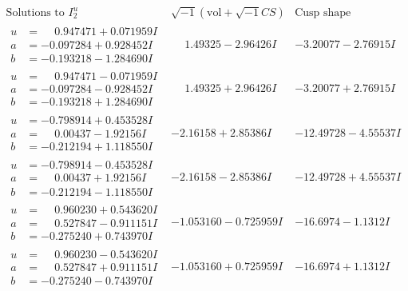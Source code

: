 \documentclass[1p]{elsarticle_modified}
\theoremstyle{definition}
\newcommand{\I}{\sqrt{-1}}
\begin{document}
$$\begin{array}{c|c|c}  
\text{Solutions to }I^u_{2}& \I (\text{vol} + \sqrt{-1}CS) & \text{Cusp shape}\\
 \hline 
\begin{aligned}
u &= \phantom{-}0.947471 + 0.071959 I \\
a &= -0.097284 + 0.928452 I \\
b &= -0.193218 - 1.284690 I\end{aligned}
 & \phantom{-}1.49325 - 2.96426 I & -3.20077 - 2.76915 I \\ \hline\begin{aligned}
u &= \phantom{-}0.947471 - 0.071959 I \\
a &= -0.097284 - 0.928452 I \\
b &= -0.193218 + 1.284690 I\end{aligned}
 & \phantom{-}1.49325 + 2.96426 I & -3.20077 + 2.76915 I \\ \hline\begin{aligned}
u &= -0.798914 + 0.453528 I \\
a &= \phantom{-}0.00437 - 1.92156 I \\
b &= -0.212194 + 1.118550 I\end{aligned}
 & -2.16158 + 2.85386 I & -12.49728 - 4.55537 I \\ \hline\begin{aligned}
u &= -0.798914 - 0.453528 I \\
a &= \phantom{-}0.00437 + 1.92156 I \\
b &= -0.212194 - 1.118550 I\end{aligned}
 & -2.16158 - 2.85386 I & -12.49728 + 4.55537 I \\ \hline\begin{aligned}
u &= \phantom{-}0.960230 + 0.543620 I \\
a &= \phantom{-}0.527847 - 0.911151 I \\
b &= -0.275240 + 0.743970 I\end{aligned}
 & -1.053160 - 0.725959 I & -16.6974 - 1.1312 I \\ \hline\begin{aligned}
u &= \phantom{-}0.960230 - 0.543620 I \\
a &= \phantom{-}0.527847 + 0.911151 I \\
b &= -0.275240 - 0.743970 I\end{aligned}
 & -1.053160 + 0.725959 I & -16.6974 + 1.1312 I \\ \hline\begin{aligned}

\end{aligned}
\end{array}$$
\end{document}
